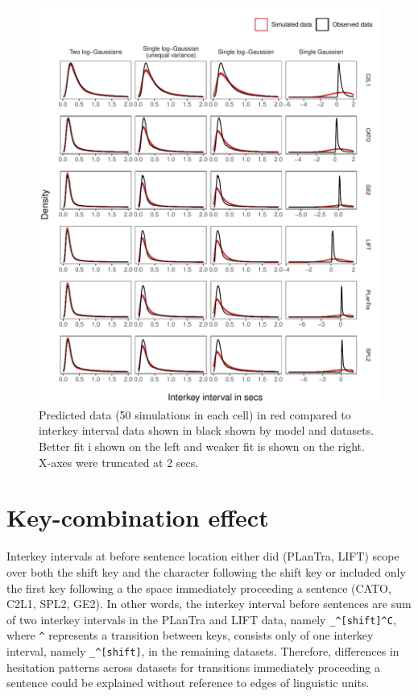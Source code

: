 \documentclass[
  man,floatsintext]{apa7}
\begin{document}
\begin{figure}

{\centering \includegraphics{figures/fitplots} 

}

\caption{Predicted data (50 simulations in each cell) in red compared to interkey interval data shown in black shown by model and datasets. Better fit i shown on the left and weaker fit is shown on the right. X-axes were truncated at 2 secs.}\label{fig:prediction}
\end{figure}

\newpage

\hypertarget{key-combination-effect}{%
\section{Key-combination effect}\label{key-combination-effect}}

Interkey intervals at before sentence location either did (PLanTra, LIFT) scope over both the shift key and the character following the shift key or included only the first key following a the space immediately proceeding a sentence (CATO, C2L1, SPL2, GE2). In other words, the interkey interval before sentences are sum of two interkey intervals in the PLanTra and LIFT data, namely \texttt{\_\^{}{[}shift{]}\^{}C}, where \texttt{\^{}} represents a transition between keys, consists only of one interkey interval, namely \texttt{\_\^{}{[}shift{]}}, in the remaining datasets. Therefore, differences in hesitation patterns across datasets for transitions immediately proceeding a sentence could be explained without reference to edges of linguistic units.
\end{document}
